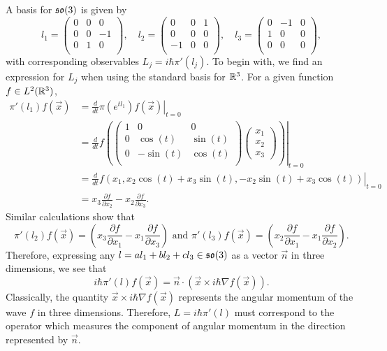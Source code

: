 \documentclass[a4paper]{article}
\begin{document}
A basis for $\mathfrak{so}(3)$ is given by 
$$l_1 = \begin{pmatrix} 0 & 0 & 0 \\ 0 & 0 & -1 \\ 0 & 1 & 0 \\ \end{pmatrix}, \hspace{1em} l_2 = \begin{pmatrix} 0 & 0 & 1 \\ 0 & 0 & 0 \\ -1 & 0 & 0 \\ \end{pmatrix}, \hspace{1em} l_3 = \begin{pmatrix} 0 & -1 & 0 \\ 1 & 0 & 0 \\ 0 & 0 & 0 \\ \end{pmatrix},$$
with corresponding observables $L_j = i\hbar\pi'(l_j)$.  To begin with, we find an expression for $L_j$ when using the standard basis for $\mathbb{R}^3$. For a given function $f \in L^2(\mathbb{R}^3)$,
\begin{align*}
    \pi'(l_1)f(\vec{x}) &= \left. \frac{d}{dt} \pi\left(e^{t l_1}\right)f(\vec{x}) \right|_{t=0}\\ 
    &= \left. \frac{d}{dt} f\left(\begin{pmatrix} 1 & 0 & 0 \\ 0 & \cos(t) & \sin(t) \\ 0 & -\sin(t) & \cos(t) \\ \end{pmatrix} \begin{pmatrix}x_1 \\ x_2 \\ x_3 \end{pmatrix}\right) \right|_{t=0}\\
    &= \left. \frac{d}{dt} f(x_1, x_2\cos(t) + x_3 \sin(t), -x_2\sin(t) + x_3 \cos(t)) \right|_{t=0}\\ 
    &= x_3\frac{\partial f}{\partial x_2} - x_2\frac{\partial f}{\partial x_3}.
\end{align*}
Similar calculations show that 
$$\pi'(l_2)f(\vec{x}) = \left(x_3\frac{\partial f}{\partial x_1} - x_1\frac{\partial f}{\partial x_3}\right) \text{  and  } \pi'(l_3)f(\vec{x}) = \left(x_2\frac{\partial f}{\partial x_1} - x_1\frac{\partial f}{\partial x_2}\right).$$
Therefore, expressing any $l = al_1 + bl_2 + cl_3 \in \mathfrak{so}(3)$ as a vector $\vec{n}$ in three dimensions, we see that 
$$i\hbar\pi'(l)f(\vec{x}) = \vec{n} \cdot (\vec{x} \times i\hbar \nabla f(\vec{x})).$$
Classically, the quantity $\vec{x} \times i\hbar \nabla f(\vec{x})$ represents the angular momentum of the wave $f$ in three dimensions. Therefore, $L = i\hbar\pi'(l)$ must correspond to the operator which measures the component of angular momentum in the direction represented by $\vec{n}$.
\end{document}
